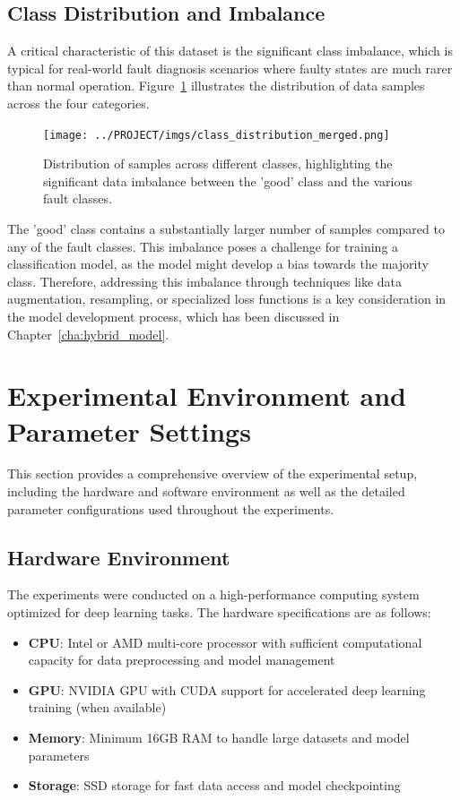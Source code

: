 \subsection{Class Distribution and Imbalance}
A critical characteristic of this dataset is the significant class imbalance, which is typical for real-world fault diagnosis scenarios where faulty states are much rarer than normal operation. Figure~\ref{fig:class_distribution_merged} illustrates the distribution of data samples across the four categories.

\begin{figure}[h!]
    \centering
    \texttt{[image: ../PROJECT/imgs/class\_distribution\_merged.png]}
    \caption{Distribution of samples across different classes, highlighting the significant data imbalance between the 'good' class and the various fault classes.}
    \label{fig:class_distribution_merged}
\end{figure}

The 'good' class contains a substantially larger number of samples compared to any of the fault classes. This imbalance poses a challenge for training a classification model, as the model might develop a bias towards the majority class. Therefore, addressing this imbalance through techniques like data augmentation, resampling, or specialized loss functions is a key consideration in the model development process, which has been discussed in Chapter~\ref{cha:hybrid_model}.

\section{Experimental Environment and Parameter Settings}
\label{sec:experiments:environment_parameters}

This section provides a comprehensive overview of the experimental setup, including the hardware and software environment as well as the detailed parameter configurations used throughout the experiments.

\subsection{Hardware Environment}
\label{subsec:hardware_environment}

The experiments were conducted on a high-performance computing system optimized for deep learning tasks. The hardware specifications are as follows:

\begin{itemize}
    \item \textbf{CPU}: Intel or AMD multi-core processor with sufficient computational capacity for data preprocessing and model management
    \item \textbf{GPU}: NVIDIA GPU with CUDA support for accelerated deep learning training (when available)
    \item \textbf{Memory}: Minimum 16GB RAM to handle large datasets and model parameters
    \item \textbf{Storage}: SSD storage for fast data access and model checkpointing
\end{itemize}

